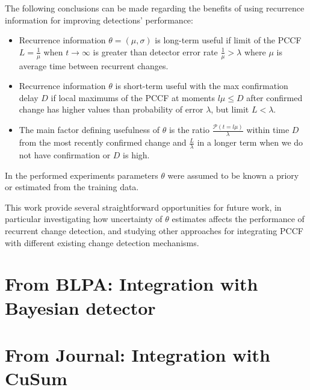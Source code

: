 The following conclusions can be made regarding the benefits of using recurrence information for improving detections' performance:
\begin{itemize}
  \item Recurrence information $\theta=(\mu, \sigma)$ is long-term useful if limit of the PCCF $L = \frac{1}{\mu}$ when $t \to \infty$ is greater than detector error rate $\frac{1}{\mu} > \lambda$ where $\mu$ is average time between recurrent changes.
  \item Recurrence information $\theta$ is short-term useful with the max confirmation delay $D$ if local maximums of the PCCF at moments $l \mu \leq D$ after confirmed change has higher values than probability of error $\lambda$,
      but limit $L < \lambda$.
  \item The main factor defining usefulness of $\theta$ is the ratio $\frac{\mathcal{P}(t = l \mu)}{\lambda}$ within time $D$ from the most recently confirmed change and $\frac{L}{\lambda}$ in a longer term when we do not have confirmation or $D$ is high.
\end{itemize}
In the performed experiments parameters $\theta$ were assumed to be known a priory or estimated from the training data.

This work provide several straightforward opportunities for future work, in particular investigating how uncertainty of $\theta$ estimates affects the performance of recurrent change detection, and studying other approaches for integrating PCCF with different existing change detection mechanisms.

\section{From BLPA: Integration with Bayesian detector}


\section{From Journal: Integration with CuSum}
